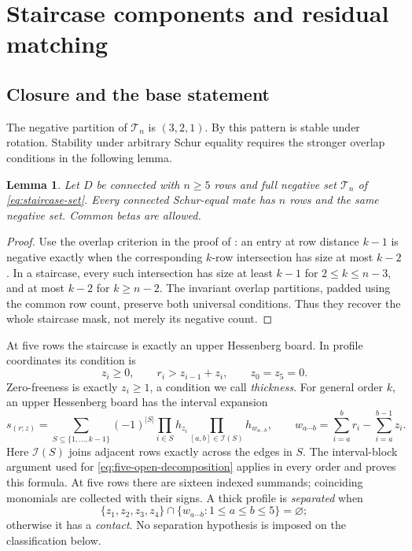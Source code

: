 \documentclass[11pt,a4paper]{amsart}
\numberwithin{equation}{section}
\theoremstyle{plain}
\newtheorem{lemma}[theorem]{Lemma}
\theoremstyle{definition}
\begin{document}
\section{Staircase components and residual matching}\label{sec:staircase}

\subsection{Closure and the base statement}

The negative partition of \(\mathcal T_n\) is \((3,2,1)\).
By  this pattern is stable under rotation.
Stability under arbitrary Schur equality requires the stronger overlap
conditions in the following lemma.

\begin{lemma}\label{lem:staircase-closure}
Let \(D\) be connected with \(n\ge5\) rows and full negative set
\(\mathcal T_n\) of \eqref{eq:staircase-set}.  Every connected
Schur-equal mate has \(n\) rows and the same negative set.  Common betas
are allowed.
\end{lemma}

\begin{proof}
Use the overlap criterion in the proof of
: an entry at row distance \(k-1\) is
negative exactly when the corresponding \(k\)-row intersection has size
at most \(k-2\).  In a staircase, every such intersection has size
at least \(k-1\) for \(2\le k\le n-3\), and at most \(k-2\)
for \(k\ge n-2\).  The invariant overlap partitions, padded using
the common row count, preserve both universal conditions.  Thus they
recover the whole staircase mask, not merely its negative count.
\end{proof}

At five rows the staircase is exactly an upper Hessenberg board.  In
profile coordinates its condition is
\begin{equation}\label{eq:hessenberg-domain}
 z_i\ge0,\qquad r_i>z_{i-1}+z_i,\qquad z_0=z_5=0.
\end{equation}
Zero-freeness is exactly \(z_i\ge1\), a condition we call \emph{thickness}.
For general order \(k\), an upper Hessenberg board has the interval expansion
\begin{equation}\label{eq:interval-expansion}
 s_{(r;z)}=\sum_{S\subseteq\{1,\ldots,k-1\}}(-1)^{|S|}
       \prod_{i\in S}h_{z_i}\prod_{[a,b]\in\mathcal I(S)}h_{w_{a\cdots b}},
 \qquad
 w_{a\cdots b}=\sum_{i=a}^b r_i-\sum_{i=a}^{b-1}z_i.
\end{equation}
Here \(\mathcal I(S)\) joins adjacent rows exactly across the edges in
\(S\).  The interval-block argument used for
\eqref{eq:five-open-decomposition} applies in every order and proves
this formula.  At five rows there are sixteen indexed summands;
coinciding monomials are collected with their signs.
A thick profile is \emph{separated} when
\[
 \{z_1,z_2,z_3,z_4\}\cap
 \{w_{a\cdots b}:1\le a\le b\le5\}=\varnothing;
\]
otherwise it has a \emph{contact}.  No separation hypothesis is imposed
on the classification below.
\end{document}
